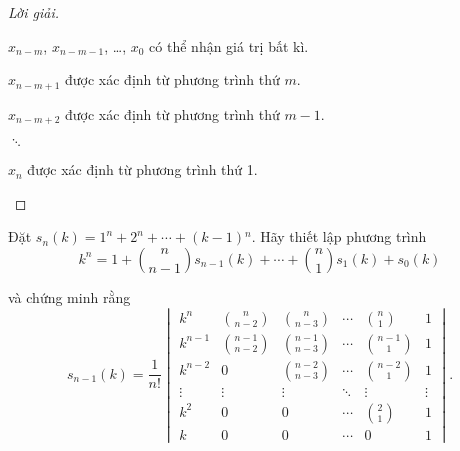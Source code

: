 \documentclass[class=linear-algebra,crop=false]{standalone}
\begin{document}
\begin{proof}[Lời giải]
\begin{enumerate}[label = \textbf{Trường hợp \arabic*.},itemindent=2cm]
		      \par $x_{n-m}$, $x_{n-m-1}$, \ldots, $x_{0}$ có thể nhận giá trị bất kì.
		      \par $x_{n-m+1}$ được xác định từ phương trình thứ $m$.
		      \par $x_{n-m+2}$ được xác định từ phương trình thứ $m-1$.
		      \par $\ddots$
		      \par $x_{n}$ được xác định từ phương trình thứ 1.
	\end{enumerate}
\end{proof}

\begin{exercise}
	\par Đặt $s_{n}(k) = 1^{n} + 2^{n} + \cdots + (k-1){}^{n}$. Hãy thiết lập phương trình
	\[
		k^{n} = 1 + \binom{n}{n-1}s_{n-1}(k) + \cdots + \binom{n}{1}s_{1}(k) + s_{0}(k)
	\]
	\par và chứng minh rằng
	\[
		s_{n-1}(k) = \frac{1}{n!}
		\begin{vmatrix}
			k^{n}   & \binom{n}{n-2}   & \binom{n}{n-3}   & \cdots & \binom{n}{1}   & 1      \\
			k^{n-1} & \binom{n-1}{n-2} & \binom{n-1}{n-3} & \cdots & \binom{n-1}{1} & 1      \\
			k^{n-2} & 0                & \binom{n-2}{n-3} & \cdots & \binom{n-2}{1} & 1      \\
			\vdots  & \vdots           & \vdots           & \ddots & \vdots         & \vdots \\
			k^{2}   & 0                & 0                & \cdots & \binom{2}{1}   & 1      \\
			k       & 0                & 0                & \cdots & 0              & 1
		\end{vmatrix}.
	\]
\end{exercise}
\end{document}
